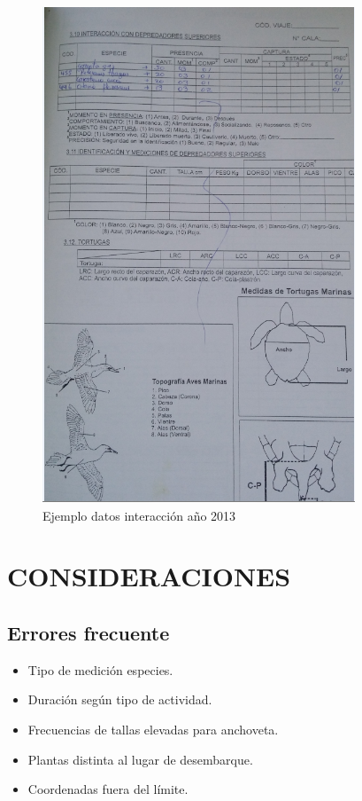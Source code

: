\documentclass[a4paper,oneside,11pt]{book}
\begin{document}
 \begin{figure}
 \centering
 \includegraphics[width=0.8\linewidth]{imagen_Manual_PBP/nuevo2}
 \caption{Ejemplo datos interacción año 2013}
 \label{fig:inter}
 \end{figure}
 
\chapter{CONSIDERACIONES}
\section{Errores frecuente}
\begin{itemize}
\item{} Tipo de medición especies.
\item{} Duración según tipo de actividad.
\item{} Frecuencias de tallas elevadas para anchoveta.
\item{} Plantas distinta al lugar de desembarque.
\item{} Coordenadas fuera del límite.
\end{itemize}
\end{document}

